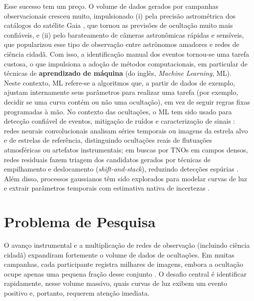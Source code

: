 Esse sucesso tem um preço. O volume de dados gerados por campanhas observacionais cresceu muito, impulsionado (i) pela precisão astrométrica dos catálogos do satélite Gaia \citep{Gaia2016, GaiaDR3}, que tornou as previsões de ocultação muito mais confiáveis, e (ii) pelo barateamento de câmeras astronômicas rápidas e sensíveis, que popularizou esse tipo de observação entre astrônomos amadores e redes de ciência cidadã. Com isso, a identificação manual dos eventos tornou-se uma tarefa custosa, o que impulsiona a adoção de métodos computacionais, em particular de técnicas de \textbf{aprendizado de máquina} (do inglês, \textit{Machine Learning}, ML). Neste contexto, ML refere-se a algoritmos que, a partir de dados de exemplo, ajustam internamente seus parâmetros para realizar uma tarefa (por exemplo, decidir se uma curva contém ou não uma ocultação), em vez de seguir regras fixas programadas à mão. No contexto das ocultações, o ML tem sido usado para detecção confiável de eventos, mitigação de ruídos e caracterização de sinais \citep{Cazeneuve2023}: redes neurais convolucionais \citep[como a ODNet,][]{Cazeneuve2023} analisam séries temporais ou imagens da estrela alvo e de estrelas de referência, distinguindo ocultações reais de flutuações atmosféricas ou artefatos instrumentais; em buscas por TNOs em campos densos, redes residuais fazem triagem dos candidatos gerados por técnicas de empilhamento e deslocamento (\textit{shift-and-stack}), reduzindo detecções espúrias \citep{Fraser2024}. Além disso, processos gaussianos têm sido explorados para modelar curvas de luz e extrair parâmetros temporais com estimativa nativa de incertezas \citep{Knieling2024, Deisenroth2019}.

\section{Problema de Pesquisa}

O avanço instrumental e a multiplicação de redes de observação (incluindo ciência cidadã) expandiram fortemente o volume de dados de ocultações. Em muitas campanhas, cada participante registra milhares de imagens, embora a ocultação ocupe apenas uma pequena fração desse conjunto \citep{Cazeneuve2023}. O desafio central é identificar rapidamente, nesse volume massivo, quais curvas de luz exibem um evento positivo e, portanto, requerem atenção imediata.

